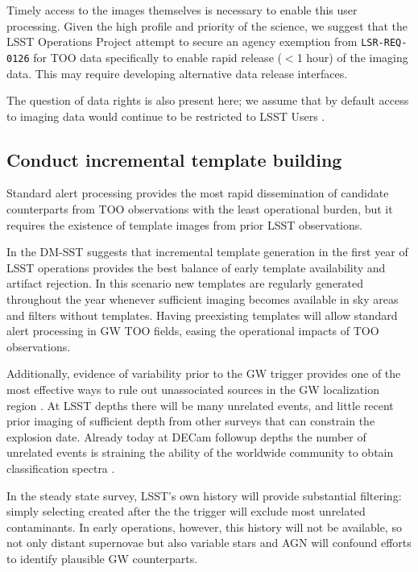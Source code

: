 \documentclass[OPS,toc,lsstdraft]{lsstdoc}
\begin{document}
Timely access to the images themselves is necessary to enable this user processing.
Given the high profile and priority of the science, we suggest that the LSST Operations Project attempt to secure an agency exemption from \texttt{LSR-REQ-0126} for TOO data specifically to enable rapid release ($<$1 hour) of the imaging data.
This may require developing alternative data release interfaces.

The question of data rights is also present here; we assume that by default access to imaging data would continue to be restricted to LSST Users .


\subsection{Conduct incremental template building} \label{sec:templates}

Standard alert processing provides the most rapid dissemination of candidate counterparts from TOO observations with the least operational burden, but it requires the existence of template images from prior LSST observations.

In  the DM-SST suggests that incremental template generation in the first year of LSST operations provides the best balance of early template availability and artifact rejection.
In this scenario new templates are regularly generated throughout the year whenever sufficient imaging becomes available in sky areas and filters without templates.
Having preexisting templates will allow standard alert processing in GW TOO fields, easing the operational impacts of TOO observations.

Additionally, evidence of variability prior to the GW trigger provides one of the most effective ways to rule out unassociated sources in the GW localization region \citep[e.g.,][]{2019GCN.24223....1C, 2019GCN.26430....1S}.
At LSST depths there will be many unrelated events, and little recent prior imaging of sufficient depth from other surveys that can constrain the explosion date.
Already today at DECam followup depths the number of unrelated events is straining the ability of the worldwide community to obtain classification spectra \citep[e.g.,][]{2019ApJ...881L..16A}.

In the steady state survey, LSST's own history will provide substantial filtering: simply selecting \DIAObjects created after the the trigger will exclude most unrelated contaminants.
In early operations, however, this history will not be available, so not only distant supernovae but also variable stars and AGN will confound efforts to identify plausible GW counterparts.
\end{document}
